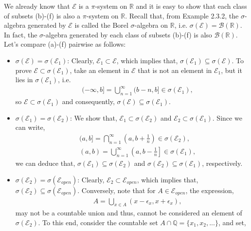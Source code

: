 \documentclass{article}
\begin{document}
We already know that $\mathcal{E}$ is a $\pi$-system on $\mathbb{R}$ and it is easy to show that each class of subsets (b)-(f) is also a $\pi$-system on $\mathbb{R}$. Recall that, from Example 2.3.2, the $\sigma$-algebra generated by $\mathcal{E}$ is called the Borel $\sigma$-algebra on $\mathbb{R}$, i.e. $\sigma(\mathcal{E}) = \mathcal{B}(\mathbb{R})$. In fact, the $\sigma$-algebra generated by each class of subsets (b)-(f) is also $\mathcal{B}(\mathbb{R})$. Let's compare (a)-(f) pairwise as follows:
\begin{itemize}
	\item $\sigma(\mathcal{E}) = \sigma(\mathcal{E}_1)$: Clearly, $\mathcal{E}_1 \subset \mathcal{E}$, which implies that, $\sigma(\mathcal{E}_1) \subseteq \sigma(\mathcal{E})$. To prove $\mathcal{E} \subset \sigma(\mathcal{E}_1)$, take an element in $\mathcal{E}$ that is not an element in $\mathcal{E}_1$, but it lies in $\sigma(\mathcal{E}_1)$, i.e.
	\begin{eqnarray}
		\nonumber
		&{}&(-\infty, b] = \bigcup_{n=1}^{\infty}(b - n, b] \in \sigma(\mathcal{E}_1),
	\end{eqnarray}
	so $\mathcal{E} \subset \sigma(\mathcal{E}_1)$ and consequently, $\sigma(\mathcal{E}) \subseteq \sigma(\mathcal{E}_1)$.
	\item $\sigma(\mathcal{E}_1) = \sigma(\mathcal{E}_2)$: We show that, $\mathcal{E}_1 \subset \sigma(\mathcal{E}_2)$ and $\mathcal{E}_2 \subset \sigma(\mathcal{E}_1)$. Since we can write, 
	\begin{eqnarray}
		\nonumber
		&{}&(a,b] = \bigcap_{n=1}^{\infty}\left(a, b + \frac{1}{n}\right) \in \sigma(\mathcal{E}_2), \\
		\nonumber
		&{}&(a,b) = \bigcup_{n=1}^{\infty}\left(a, b - \frac{1}{n}\right] \in \sigma(\mathcal{E}_1),
	\end{eqnarray}
	we can deduce that, $\sigma(\mathcal{E}_1) \subseteq \sigma(\mathcal{E}_2)$ and $\sigma(\mathcal{E}_2) \subseteq \sigma(\mathcal{E}_1)$, respectively.
	\item $\sigma(\mathcal{E}_2) = \sigma(\mathcal{E}_{open})$: Clearly, $\mathcal{E}_2 \subset \mathcal{E}_{open}$, which implies that, $\sigma(\mathcal{E}_2) \subseteq \sigma(\mathcal{E}_{open})$. Conversely, note that for $A \in \mathcal{E}_{open}$, the expression,
	\begin{eqnarray}
		\nonumber
		&{}&A = \bigcup_{x \in A}(x - \epsilon_x, x + \epsilon_x),
	\end{eqnarray}
	may not be a countable union and thus, cannot be considered an element of $\sigma(\mathcal{E}_2)$. To this end, consider the countable set $A \cap \mathbb{Q} = \{x_1, x_2, ...\}$, and set,

\end{itemize}
\end{document}
